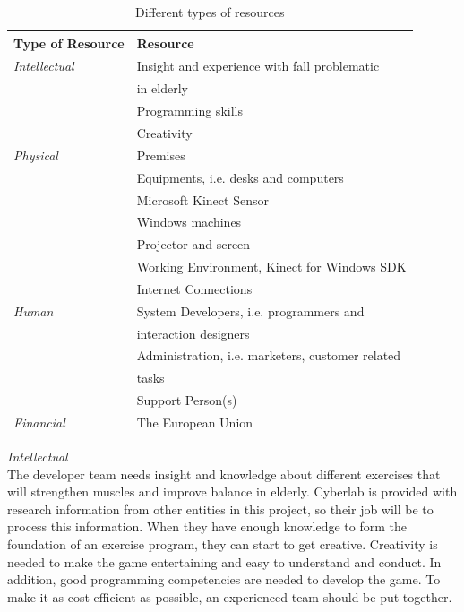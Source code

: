 \begin{table}
\centering
    \begin{tabular}{|l|l|}
        \hline
       \textbf{Type of Resource} & \textbf{Resource}  \\ \hline
       \emph{Intellectual} & Insight and experience with fall problematic \\ & in elderly \\ \cline{2-2}
        & Programming skills \\ \cline{2-2}
	 	& Creativity \\ \hline
	   \emph{Physical} & Premises \\ \cline{2-2}
	   	& Equipments, i.e. desks and computers  \\ \cline{2-2}
	   	& Microsoft Kinect Sensor \\ \cline{2-2}
	   	& Windows machines \\ \cline{2-2}
	   	& Projector and screen \\ \cline{2-2}
	   	& Working Environment, Kinect for Windows SDK \\ \cline{2-2}
	   	& Internet Connections \\ \hline
	   \emph{Human} & System Developers, i.e. programmers and \\ & interaction designers \\ \cline{2-2}
	   	& Administration, i.e. marketers, customer related \\ &tasks \\ \cline{2-2}
	   	& Support Person(s) \\ \hline
	   \emph{Financial} & The European Union \\
        \hline
    \end{tabular}
    \caption[Resources]{Different types of resources}
    \label{tab:Resources}
\end{table} 
\emph{Intellectual} \\ The developer team needs insight and knowledge about different exercises that will strengthen muscles and improve balance in elderly. Cyberlab is provided with research information from other entities in this project, so their job will be to process this information. When they have enough knowledge to form the foundation of an exercise program, they can start to get creative. Creativity is needed to make the game entertaining and easy to understand and conduct. In addition, good programming competencies are needed to develop the game. To make it as cost-efficient as possible, an experienced team should be put together. \\ \\
